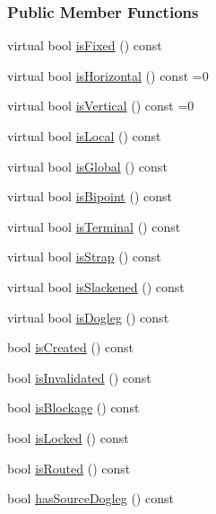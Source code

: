 \subsubsection*{Public Member Functions}
\begin{DoxyCompactItemize}
\item 
virtual bool \hyperlink{classKite_1_1TrackElement_afd7362b850709bed8b61c1aa22399f97}{is\+Fixed} () const
\item 
virtual bool \hyperlink{classKite_1_1TrackElement_a9d3db1f8a5aca58f8f54d291faebf873}{is\+Horizontal} () const =0
\item 
virtual bool \hyperlink{classKite_1_1TrackElement_a6fa2bf0568a2b295dd7cd1f7207247d5}{is\+Vertical} () const =0
\item 
virtual bool \hyperlink{classKite_1_1TrackElement_add556a145a89fdbcea82346abfb873dc}{is\+Local} () const
\item 
virtual bool \hyperlink{classKite_1_1TrackElement_a19ba379112d6b29faa45c5eefbf38500}{is\+Global} () const
\item 
virtual bool \hyperlink{classKite_1_1TrackElement_a72741158d19af38e84c5e9c08f91270f}{is\+Bipoint} () const
\item 
virtual bool \hyperlink{classKite_1_1TrackElement_a1e074cb3064037035548e5e6d238e315}{is\+Terminal} () const
\item 
virtual bool \hyperlink{classKite_1_1TrackElement_a62d61c231cf404a814ae37665fa8164f}{is\+Strap} () const
\item 
virtual bool \hyperlink{classKite_1_1TrackElement_a782cff57d3fe10e758d19ee65a06643d}{is\+Slackened} () const
\item 
virtual bool \hyperlink{classKite_1_1TrackElement_a75d91371e5281dd21f60ff39ae70a3e5}{is\+Dogleg} () const
\item 
bool \hyperlink{classKite_1_1TrackElement_af7d9cf1d7581b1cab04cf38c64f0f72a}{is\+Created} () const
\item 
bool \hyperlink{classKite_1_1TrackElement_ac540608485240ff88970131ebc02c1ab}{is\+Invalidated} () const
\item 
bool \hyperlink{classKite_1_1TrackElement_a3fffa77f98cf6f0375f831bddce8a8fe}{is\+Blockage} () const
\item 
bool \hyperlink{classKite_1_1TrackElement_a43966e19963e4bcb7f7f9b5327ec732b}{is\+Locked} () const
\item 
bool \hyperlink{classKite_1_1TrackElement_a29202b7dfab21852f8c8d773de7b3728}{is\+Routed} () const
\item 
bool \hyperlink{classKite_1_1TrackElement_ab0ab07d0bdd701562ecc14bbdb41368d}{has\+Source\+Dogleg} () const

\end{DoxyCompactItemize}
